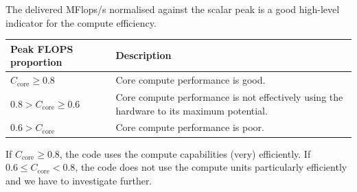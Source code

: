 \begin{performancemetric}
 The delivered MFlops/s normalised against the scalar peak is a good high-level
 indicator for the compute efficiency.
\end{performancemetric}







\begin{center}
 \begin{tabular}{p{}p{}}
  Peak FLOPS proportion & Description \\
  \hline
  $C_{\text{core}} \geq 0.8$
   & \cellcolor{green!25} Core compute performance is good.
  \\
  $0.8 > C_{\text{core}} \geq 0.6$
   & \cellcolor{yellow!25} Core compute performance is not effectively using the hardware to its maximum potential. 
  \\
  $0.6 > C_{\text{core}}$
   & \cellcolor{red!25} Core compute performance is poor.
 \end{tabular}
\end{center}

\noindent
If $C_{\text{core}} \geq 0.8$, the code uses the compute capabilities
(very) efficiently.
 If $0.6 \leq C_{\text{core}}< 0.8$, the code does not use the compute units particularly efficiently and we have to investigate further.

